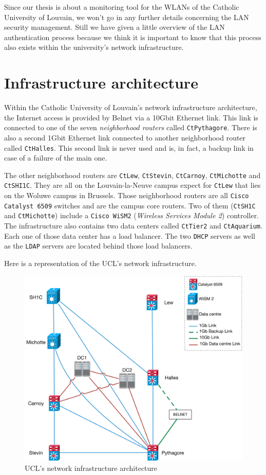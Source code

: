 Since our thesis is about a monitoring tool for the WLANs of the Catholic University of Louvain, we won't go in any further details concerning the LAN security management. 
Still we have given a little overview of the LAN authentication process because we think it is important to know that this process also exists within the university's network infrastructure.


\section{Infrastructure architecture}
Within the Catholic University of Louvain's network infrastructure architecture, the Internet access is provided by Belnet via a 10Gbit Ethernet link. This link is connected to one of the seven \textit{neighborhood routers} called \texttt{CtPythagore}. There is also a second 1Gbit Ethernet link connected to another neighborhood router called \texttt{CtHalles}. This second link is never used and is, in fact, a backup link in case of a failure of the main one.

The other neighborhood routers are \texttt{CtLew}, \texttt{CtStevin}, \texttt{CtCarnoy}, \texttt{CtMichotte} and \texttt{CtSHI1C}. They are all on the Louvain-la-Neuve campus expect for \texttt{CtLew} that lies on the Woluwe campus in Brussels. Those neighborhood routers are all \texttt{Cisco Catalyst 6509} switches and are the campus core routers. Two of them (\texttt{CtSH1C} and \texttt{CtMichotte}) include a \texttt{Cisco WiSM2} (\textit{Wireless Services Module 2}) controller. The infrastructure also contains two data centers called \texttt{CtTier2} and \texttt{CtAquarium}. Each one of those data center has a load balancer. The two \texttt{DHCP} servers as well as the \texttt{LDAP} servers are located behind those load balancers.

Here is a representation of the UCL's network infrastructure.

\begin{figure}[H]
	\includegraphics[width=1\linewidth]{Pictures/Chapter2/ucl.png}
	\caption{UCL's network infrastructure architecture}
\end{figure}


